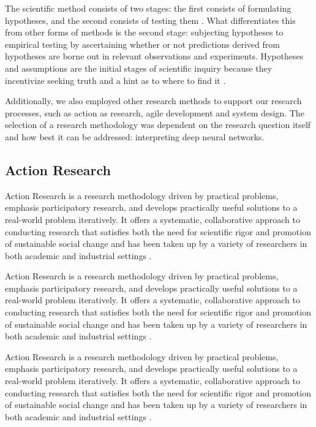The scientific method consists of two stages: the first consists of formulating hypotheses, and the second consists of testing them \cite{2016397}. What differentiates this from other forms of methods is the second stage: subjecting hypotheses to empirical testing by ascertaining whether or not predictions derived from hypotheses are borne out in relevant observations and experiments. Hypotheses and assumptions are the initial stages of scientific inquiry because they incentivize seeking truth and a hint as to where to find it \cite{AYALA2016xi}.

Additionally, we also employed other research methods to support our research processes, such as action as research, agile development and system design. The selection of a research methodology was dependent on the research question itself and how best it can be addressed: interpreting deep neural networks.

\subsection{Action Research}
Action Research is a research methodology driven by practical problems, emphasis participatory research, and develops practically useful solutions to a real-world problem iteratively. It offers a systematic, collaborative approach to conducting research that satisfies both the need for scientific rigor and promotion of sustainable social change and has been taken up by a variety of researchers in both academic and industrial settings \cite{Hayes:2011:RAR:1993060.1993065}.

Action Research is a research methodology driven by practical problems, emphasis participatory research, and develops practically useful solutions to a real-world problem iteratively. It offers a systematic, collaborative approach to conducting research that satisfies both the need for scientific rigor and promotion of sustainable social change and has been taken up by a variety of researchers in both academic and industrial settings \cite{Hayes:2011:RAR:1993060.1993065}.

Action Research is a research methodology driven by practical problems, emphasis participatory research, and develops practically useful solutions to a real-world problem iteratively. It offers a systematic, collaborative approach to conducting research that satisfies both the need for scientific rigor and promotion of sustainable social change and has been taken up by a variety of researchers in both academic and industrial settings \cite{Hayes:2011:RAR:1993060.1993065}.

